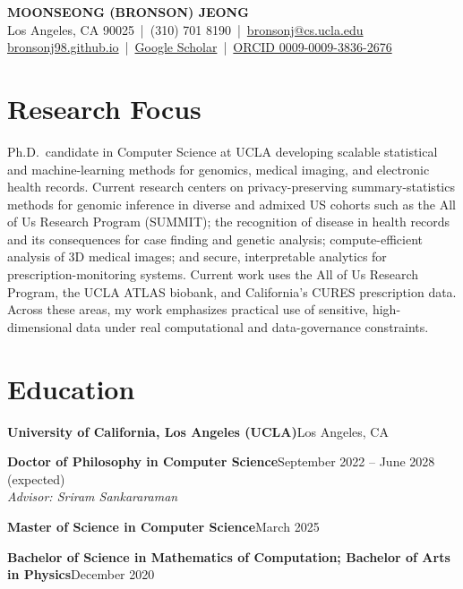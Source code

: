 \documentclass[10pt,letterpaper]{article}
\newcommand{\entry}[4]{\noindent\textbf{#1}\hfill #2\\ {\itshape #3}\hfill #4\par}
\newcommand{\entryb}[2]{\noindent\textbf{#1}\hfill #2\par}
\begin{document}
\begin{center}
{\LARGE\bfseries MOONSEONG (BRONSON) JEONG}\\[0.35em]
Los Angeles, CA 90025 \,|\, (310) 701 8190 \,|\, \href{mailto:bronsonj@cs.ucla.edu}{bronsonj@cs.ucla.edu}\\[0.15em]
\href{https://bronsonj98.github.io}{bronsonj98.github.io} \,|\, \href{https://scholar.google.com/citations?user=raOG4TkAAAAJ&hl=en}{Google Scholar} \,|\, \href{https://orcid.org/0009-0009-3836-2676}{ORCID 0009-0009-3836-2676}
\end{center}

\section{Research Focus}
Ph.D.\ candidate in Computer Science at UCLA developing scalable statistical and machine-learning methods for genomics, medical imaging, and electronic health records. Current research centers on privacy-preserving summary-statistics methods for genomic inference in diverse and admixed US cohorts such as the All of Us Research Program (SUMMIT); the recognition of disease in health records and its consequences for case finding and genetic analysis; compute-efficient analysis of 3D medical images; and secure, interpretable analytics for prescription-monitoring systems. Current work uses the All of Us Research Program, the UCLA ATLAS biobank, and California's CURES prescription data. Across these areas, my work emphasizes practical use of sensitive, high-dimensional data under real computational and data-governance constraints.

\section{Education}
\entryb{University of California, Los Angeles (UCLA)}{Los Angeles, CA}
\entry{Doctor of Philosophy in Computer Science}{September 2022 -- June 2028 (expected)}{Advisor: Sriram Sankararaman}{}
\entryb{Master of Science in Computer Science}{March 2025}
\entryb{Bachelor of Science in Mathematics of Computation; Bachelor of Arts in Physics}{December 2020}
\end{document}
